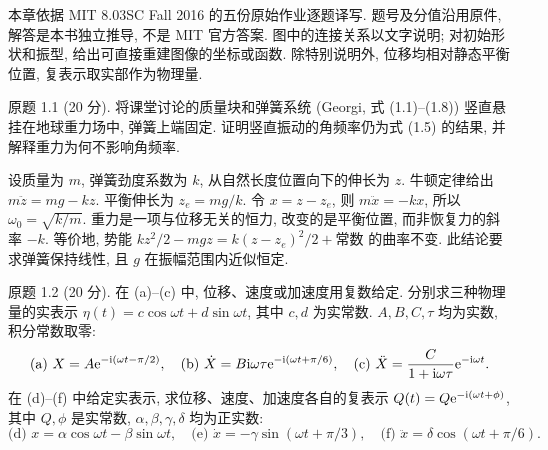 本章依据 MIT 8.03SC Fall 2016 的五份原始作业逐题译写. 题号及分值沿用原件, 解答是本书独立推导, 不是 MIT 官方答案. 图中的连接关系以文字说明; 对初始形状和振型, 给出可直接重建图像的坐标或函数. 除特别说明外, 位移均相对静态平衡位置, 复表示取实部作为物理量.
\begin{exercise}\label{ps:1.1}
原题 1.1 (20 分). 将课堂讨论的质量块和弹簧系统 (Georgi, 式 (1.1)--(1.8)) 竖直悬挂在地球重力场中, 弹簧上端固定. 证明竖直振动的角频率仍为式 (1.5) 的结果, 并解释重力为何不影响角频率.
\end{exercise}
\begin{solution}
设质量为 $m$, 弹簧劲度系数为 $k$, 从自然长度位置向下的伸长为 $z$. 牛顿定律给出 $m\ddot z=mg-kz$. 平衡伸长为 $z_e=mg/k$. 令 $x=z-z_e$, 则 $m\ddot x=-kx$, 所以 $\omega_0=\sqrt{k/m}$. 重力是一项与位移无关的恒力, 改变的是平衡位置, 而非恢复力的斜率 $-k$. 等价地, 势能 $kz^2/2-mgz=k(z-z_e)^2/2+\text{常数}$ 的曲率不变. 此结论要求弹簧保持线性, 且 $g$ 在振幅范围内近似恒定.
\end{solution}
\begin{exercise}\label{ps:1.2}
原题 1.2 (20 分). 在 (a)--(c) 中, 位移、速度或加速度用复数给定. 分别求三种物理量的实表示 $\eta(t)=c\cos\omega t+d\sin\omega t$, 其中 $c,d$ 为实常数. $A,B,C,\tau$ 均为实数, 积分常数取零:
\[
\text{(a) }X=A\mathrm e^{-\mathrm i(\omega t-\pi/2)},\quad
\text{(b) }\dot X=B\mathrm i\omega\tau\mathrm e^{-\mathrm i(\omega t+\pi/6)},\quad
\text{(c) }\ddot X=\frac{C}{1+\mathrm i\omega\tau}\mathrm e^{-\mathrm i\omega t}.
\]
在 (d)--(f) 中给定实表示, 求位移、速度、加速度各自的复表示 $Q(t)=Q\mathrm e^{-\mathrm i(\omega t+\phi)}$, 其中 $Q,\phi$ 是实常数, $\alpha,\beta,\gamma,\delta$ 均为正实数:
\[
\text{(d) }x=\alpha\cos\omega t-\beta\sin\omega t,\quad
\text{(e) }\dot x=-\gamma\sin(\omega t+\pi/3),\quad
\text{(f) }\ddot x=\delta\cos(\omega t+\pi/6).
\]
\end{exercise}
